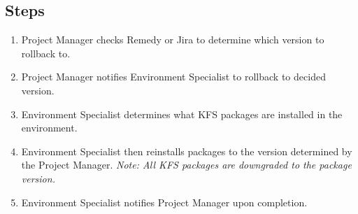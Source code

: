 \documentclass[12pt,notitlepage]{article}
\begin{document}
\subsection{Steps}
\begin{enumerate}
  \item Project Manager checks Remedy or Jira to determine which version to rollback to.
  \item Project Manager notifies Environment Specialist to rollback to decided version.
  \item Environment Specialist determines what KFS packages are installed in the environment.
  \item Environment Specialist then reinstalls packages to the version determined by the Project Manager. 
    \emph{Note: All KFS packages are downgraded to the package version.}
  \item Environment Specialist notifies Project Manager upon completion.
\end{enumerate}
\end{document}
